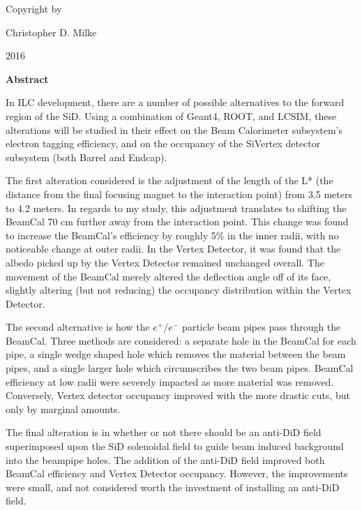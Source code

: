 \documentclass{report}
\begin{document}
    \newpage \begin{center} 
        \vspace*{\fill}
        Copyright \textcopyright by

        Christopher D. Milke 

        2016
        \vspace*{\fill}
    \end{center} \newpage


        \begin{center} \LARGE \textbf{Abstract} \end{center}

        In ILC development, there are a number of possible alternatives to the forward region of the SiD. Using a combination of Geant4, ROOT, and LCSIM, these alterations will be studied in their effect on the Beam Calorimeter subsystem's electron tagging efficiency, and on the occupancy of the SiVertex detector subsystem (both Barrel and Endcap).

        The first alteration considered is the adjustment of the length of the L* (the distance from the final focusing magnet to the interaction point) from 3.5 meters to 4.2 meters. In regards to my study, this adjustment translates to shifting the BeamCal 70 cm further away from the interaction point. This change was found to increase the BeamCal's efficiency by roughly 5\% in the inner radii, with no noticeable change at outer radii. In the Vertex Detector, it was found that the albedo picked up by the Vertex Detector remained unchanged overall. The movement of the BeamCal merely altered the deflection angle off of its face, slightly altering (but not reducing) the occupancy distribution within the Vertex Detector.

        The second alternative is how the $e^+/e^-$ particle beam pipes pass through the BeamCal. Three methods are considered: a separate hole in the BeamCal for each pipe, a single wedge shaped hole which removes the material between the beam pipes, and a single larger hole which circumscribes the two beam pipes. BeamCal efficiency at low radii were severely impacted as more material was removed. Conversely, Vertex detector occupancy improved with the more drastic cuts, but only by marginal amounts.

        The final alteration is in whether or not there should be an anti-DiD field superimposed upon the SiD solenoidal field to guide beam induced background into the beampipe holes. The addition of the anti-DiD field improved both BeamCal efficiency and Vertex Detector occupancy. However, the improvements were small, and not considered worth the investment of installing an anti-DiD field.
    \newpage
\end{document}
